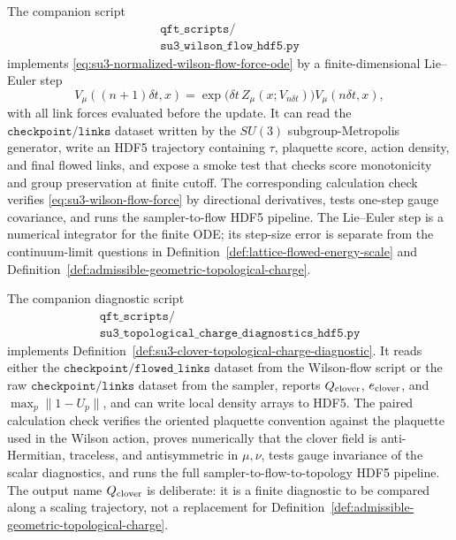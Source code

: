 The companion script
\[
  \begin{gathered}
  \texttt{qft\_scripts/}\\
  \texttt{su3\_wilson\_flow\_hdf5.py}
  \end{gathered}
\]
implements \eqref{eq:su3-normalized-wilson-flow-force-ode} by a
finite-dimensional Lie--Euler step
\begin{equation}
  V_\mu((n+1)\delta t,x)
  =
  \exp\!\bigl(\delta t\,Z_\mu(x;V_{n\delta t})\bigr)
  V_\mu(n\delta t,x),
  \label{eq:su3-wilson-flow-lie-euler-step}
\end{equation}
with all link forces evaluated before the update.  It can read the
\(\texttt{checkpoint/links}\) dataset written by the \(SU(3)\)
subgroup-Metropolis generator, write an HDF5 trajectory containing
\(\tau\), plaquette score, action density, and final flowed links, and expose
a smoke test that checks score monotonicity and group preservation at finite
cutoff.  The corresponding calculation check verifies
\eqref{eq:su3-wilson-flow-force} by directional derivatives, tests one-step
gauge covariance, and runs the sampler-to-flow HDF5 pipeline.  The
Lie--Euler step is a numerical integrator for the finite ODE; its step-size
error is separate from the continuum-limit questions in
Definition~\ref{def:lattice-flowed-energy-scale} and
Definition~\ref{def:admissible-geometric-topological-charge}.

The companion diagnostic script
\[
  \begin{gathered}
  \texttt{qft\_scripts/}\\
  \texttt{su3\_topological\_charge\_diagnostics\_hdf5.py}
  \end{gathered}
\]
implements Definition~\ref{def:su3-clover-topological-charge-diagnostic}.
It reads either the \(\texttt{checkpoint/flowed\_links}\) dataset from the
Wilson-flow script or the raw \(\texttt{checkpoint/links}\) dataset from the
sampler, reports \(Q_{\rm clover}\), \(e_{\rm clover}\), and
\(\max_p\|1-U_p\|\), and can write local density arrays to HDF5.  The
paired calculation check verifies the oriented plaquette convention against
the plaquette used in the Wilson action, proves numerically that the clover
field is anti-Hermitian, traceless, and antisymmetric in \(\mu,\nu\), tests
gauge invariance of the scalar diagnostics, and runs the full
sampler-to-flow-to-topology HDF5 pipeline.  The output name
\(Q_{\rm clover}\) is deliberate: it is a finite diagnostic to be compared
along a scaling trajectory, not a replacement for
Definition~\ref{def:admissible-geometric-topological-charge}.

